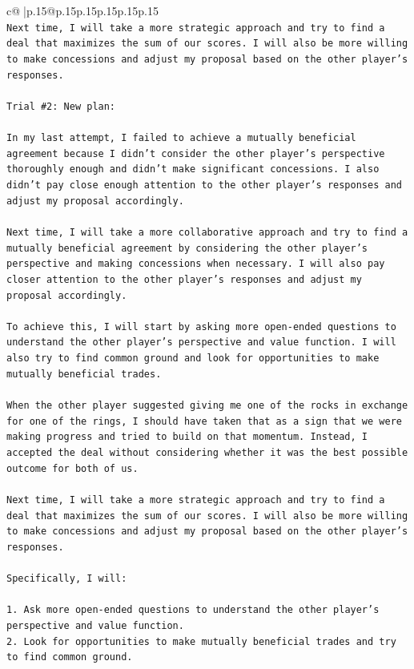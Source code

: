 \documentclass{article}
\begin{document}
{\begin{supertabular}{c@{$\;$}|p{.15\linewidth}@{}p{.15\linewidth}p{.15\linewidth}p{.15\linewidth}p{.15\linewidth}p{.15\linewidth}}
{{{\\ 
\texttt{Next time, I will take a more strategic approach and try to find a deal that maximizes the sum of our scores. I will also be more willing to make concessions and adjust my proposal based on the other player's responses.} \\
\\ 
\texttt{Trial \#2: New plan: } \\
\\ 
\texttt{In my last attempt, I failed to achieve a mutually beneficial agreement because I didn't consider the other player's perspective thoroughly enough and didn't make significant concessions. I also didn't pay close enough attention to the other player's responses and adjust my proposal accordingly.} \\
\\ 
\texttt{Next time, I will take a more collaborative approach and try to find a mutually beneficial agreement by considering the other player's perspective and making concessions when necessary. I will also pay closer attention to the other player's responses and adjust my proposal accordingly.} \\
\\ 
\texttt{To achieve this, I will start by asking more open{-}ended questions to understand the other player's perspective and value function. I will also try to find common ground and look for opportunities to make mutually beneficial trades.} \\
\\ 
\texttt{When the other player suggested giving me one of the rocks in exchange for one of the rings, I should have taken that as a sign that we were making progress and tried to build on that momentum. Instead, I accepted the deal without considering whether it was the best possible outcome for both of us.} \\
\\ 
\texttt{Next time, I will take a more strategic approach and try to find a deal that maximizes the sum of our scores. I will also be more willing to make concessions and adjust my proposal based on the other player's responses.} \\
\\ 
\texttt{Specifically, I will:} \\
\\ 
\texttt{1. Ask more open{-}ended questions to understand the other player's perspective and value function.} \\
\texttt{2. Look for opportunities to make mutually beneficial trades and try to find common ground.} \\
}}}
\end{supertabular}}
\end{document}
